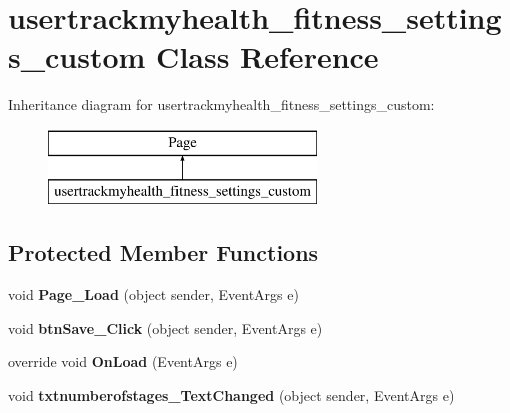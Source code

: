 \hypertarget{classusertrackmyhealth__fitness__settings__custom}{\section{usertrackmyhealth\-\_\-fitness\-\_\-settings\-\_\-custom Class Reference}
\label{classusertrackmyhealth__fitness__settings__custom}
}
Inheritance diagram for usertrackmyhealth\-\_\-fitness\-\_\-settings\-\_\-custom\-:\begin{figure}[H]
\begin{center}
\leavevmode
\includegraphics[height=2.000000cm]{classusertrackmyhealth__fitness__settings__custom}
\end{center}
\end{figure}
\subsection*{Protected Member Functions}
\begin{DoxyCompactItemize}
\item 
\hypertarget{classusertrackmyhealth__fitness__settings__custom_af8ac991db1b83b70b34a61cc696dfe79}{void {\bfseries Page\-\_\-\-Load} (object sender, Event\-Args e)}\label{classusertrackmyhealth__fitness__settings__custom_af8ac991db1b83b70b34a61cc696dfe79}

\item 
\hypertarget{classusertrackmyhealth__fitness__settings__custom_a2c82c3c5ea8aac5633e8b353366b31ea}{void {\bfseries btn\-Save\-\_\-\-Click} (object sender, Event\-Args e)}\label{classusertrackmyhealth__fitness__settings__custom_a2c82c3c5ea8aac5633e8b353366b31ea}

\item 
\hypertarget{classusertrackmyhealth__fitness__settings__custom_a4464e3d1382e1ee29893131b1b7f9b95}{override void {\bfseries On\-Load} (Event\-Args e)}\label{classusertrackmyhealth__fitness__settings__custom_a4464e3d1382e1ee29893131b1b7f9b95}

\item 
\hypertarget{classusertrackmyhealth__fitness__settings__custom_a2555f32254700b69bb3dbe1ecce99322}{void {\bfseries txtnumberofstages\-\_\-\-Text\-Changed} (object sender, Event\-Args e)}\label{classusertrackmyhealth__fitness__settings__custom_a2555f32254700b69bb3dbe1ecce99322}

\end{DoxyCompactItemize}


